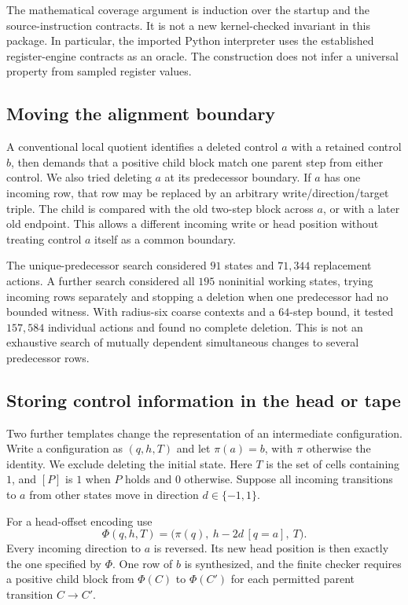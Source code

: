 The mathematical coverage argument is induction over the startup and the
source-instruction contracts. It is not a new kernel-checked invariant in this
package. In particular, the imported Python interpreter uses the established
register-engine contracts as an oracle. The construction does not infer a
universal property from sampled register values.

\subsection{Moving the alignment boundary}

A conventional local quotient identifies a deleted control $a$ with a retained
control $b$, then demands that a positive child block match one parent step
from either control. We also tried deleting $a$ at its predecessor boundary.
If $a$ has one incoming row, that row may be replaced by an arbitrary
write/direction/target triple. The child is compared with the old two-step
block across $a$, or with a later old endpoint. This allows a different
incoming write or head position without treating control $a$ itself as a
common boundary.

The unique-predecessor search considered $91$ states and $71,344$ replacement
actions. A further search considered all $195$ noninitial working states,
trying incoming rows separately and stopping a deletion when one predecessor
had no bounded witness. With radius-six coarse contexts and a $64$-step
bound, it tested $157,584$ individual actions and found no complete deletion.
This is not an exhaustive search of mutually dependent simultaneous changes
to several predecessor rows.

\subsection{Storing control information in the head or tape}

Two further templates change the representation of an intermediate
configuration. Write a configuration as $(q,h,T)$ and let $\pi(a)=b$, with
$\pi$ otherwise the identity. We exclude deleting the initial state.
Here $T$ is the set of cells containing $1$, and $[P]$ is $1$ when $P$ holds and $0$ otherwise.
Suppose all incoming transitions to $a$ from other states move in direction
$d\in\{-1,1\}$.

For a head-offset encoding use
\[
 \Phi(q,h,T)=\bigl(\pi(q),\ h-2d\,[q=a],\ T\bigr).
\]
Every incoming direction to $a$ is reversed. Its new head position is then
exactly the one specified by $\Phi$. One row of $b$ is synthesized, and the
finite checker requires a positive child block from $\Phi(C)$ to
$\Phi(C')$ for each permitted parent transition $C\to C'$.

